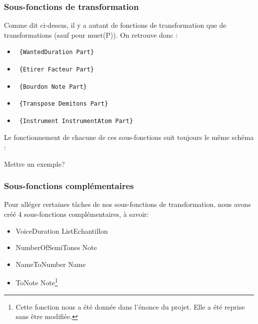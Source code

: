 \documentclass[10pt,a4paper]{article}
\begin{document}
\subsubsection{Sous-fonctions de transformation}
Comme dit ci-dessus, il y a autant de fonctions de transformation que de transformations (sauf pour muet(P)). 
On retrouve donc :
\begin{itemize}
	\item \begin{verbatim} {WantedDuration Part} \end{verbatim}
	\item \begin{verbatim} {Etirer Facteur Part} \end{verbatim}
	\item \begin{verbatim} {Bourdon Note Part} \end{verbatim}
	\item \begin{verbatim} {Transpose Demitons Part} \end{verbatim}
	\item \begin{verbatim} {Instrument InstrumentAtom Part} \end{verbatim} 
\end{itemize}

Le fonctionnement  de chacune de ces sous-fonctions suit toujours le même schéma :

Mettre un exemple?

\subsubsection{Sous-fonctions complémentaires}
Pour alléger certaines tâches de nos sous-fonctions de transformation,  nous avons créé 4 sous-fonctions complémentaires, à savoir:
\begin{itemize}
	\item {VoiceDuration ListEchantillon}
	\item {NumberOfSemiTones Note}
	\item {NameToNumber Name}
	\item {ToNote Note}\footnote{Cette fonction nous a été donnée dans l'énonce du projet. Elle a été reprise sans être modifiée.}
\end{itemize}
\end{document}
